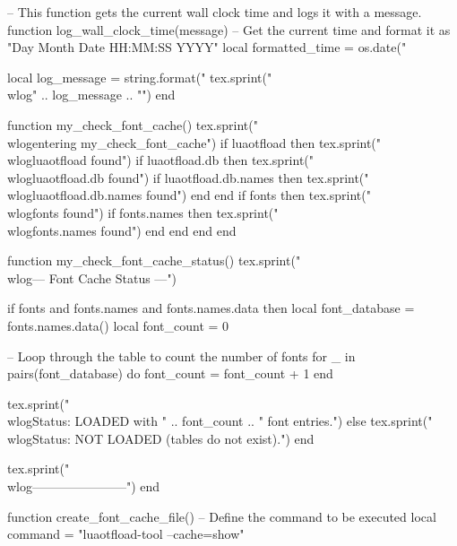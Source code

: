 \usepackage{luacode}
\RequirePackage{verbatim} %
\RequirePackage{comment}


\begin{luacode*}
-- This function gets the current wall clock time and logs it with a message.
function log_wall_clock_time(message)
  -- Get the current time and format it as "Day Month Date HH:MM:SS YYYY"
  local formatted_time = os.date("%
  
  local log_message = string.format("%
  tex.sprint("\\wlog{" .. log_message .. "}")
end

function my_check_font_cache()
    tex.sprint("\\wlog{entering my_check_font_cache}")
    if luaotfload then
        tex.sprint("\\wlog{luaotfload found}")
        if luaotfload.db then
            tex.sprint("\\wlog{luaotfload.db found}")
            if luaotfload.db.names then
                tex.sprint("\\wlog{luaotfload.db.names found}")
            end
        end
        if fonts then
            tex.sprint("\\wlog{fonts found}")
            if fonts.names then
                tex.sprint("\\wlog{fonts.names found}")
            end
        end
    end
end

function my_check_font_cache_status()
  tex.sprint("\\wlog{--- Font Cache Status ---}")

  if fonts and fonts.names and fonts.names.data then
    local font_database = fonts.names.data()
    local font_count = 0
    
    -- Loop through the table to count the number of fonts
    for _ in pairs(font_database) do
      font_count = font_count + 1
    end
    
    tex.sprint("\\wlog{Status: LOADED with " .. font_count .. " font entries.}")
  else
    tex.sprint("\\wlog{Status: NOT LOADED (tables do not exist).}")
  end

  tex.sprint("\\wlog{-----------------------}")
end

function create_font_cache_file()
  -- Define the command to be executed
  local command = "luaotfload-tool --cache=show"
  

\end{luacode*}
